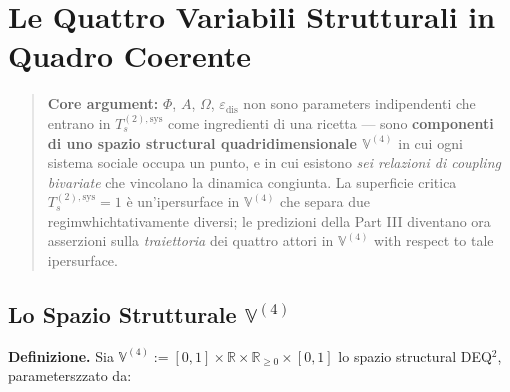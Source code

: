 \chapter{Le Quattro Variabili Strutturali in Quadro
Coerente}\label{le-quattro-variables-strutturali-in-quadro-coerente}

\begin{quote}
\textbf{Core argument:} \(\Phi\), \(A\), \(\Omega\),
\(\varepsilon_{\text{dis}}\) non sono parameters indipendenti che entrano
in \(T_s^{(2),\text{sys}}\) come ingredienti di una ricetta --- sono
\textbf{componenti di uno spazio structural quadridimensionale
\(\mathbb{V}^{(4)}\)} in cui ogni sistema sociale occupa un punto, e in
cui esistono \emph{sei relazioni di coupling bivariate} che
vincolano la dinamica congiunta. La superficie critica
\(T_s^{(2),\text{sys}} = 1\) è un'ipersurface in \(\mathbb{V}^{(4)}\)
che separa due regimwhichtativamente diversi; le predizioni della
Part III diventano ora asserzioni sulla \emph{traiettoria} dei quattro
attori in \(\mathbb{V}^{(4)}\) with respect to tale ipersurface.
\end{quote}



\section{\texorpdfstring{Lo Spazio Strutturale
\(\mathbb{V}^{(4)}\)}{Lo Spazio Strutturale \textbackslash mathbb\{V\}\^{}\{(4)\}}}\label{lo-spazio-structural-mathbbv4}

\Hypoth{} \textbf{Definizione.} Sia
\(\mathbb{V}^{(4)} := [0, 1] \times \mathbb{R} \times \mathbb{R}_{\geq 0} \times [0, 1]\)
lo spazio structural DEQ$^2$, parameterszzato da:


